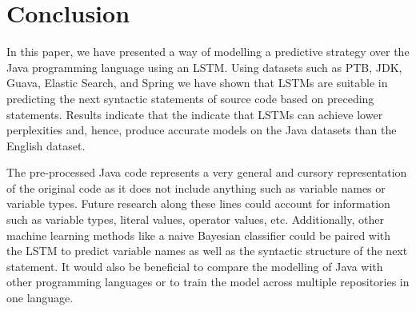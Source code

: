 \documentclass{article}
\begin{document}

\section{Conclusion}

In this paper, we have presented a way of modelling a predictive strategy
over the Java programming language using an LSTM. Using datasets such as PTB,
JDK, Guava, Elastic Search, and Spring we have shown that
LSTMs are suitable in predicting the next syntactic statements of source
code based on preceding statements. Results indicate that the indicate
that LSTMs can achieve lower perplexities and, hence, produce accurate models
on the Java datasets than the English dataset.

The pre-processed Java code represents a very general and cursory
representation of the original code as it does not include anything such
as variable names or variable types. Future research along these lines
could account for information such as variable types, literal values,
operator values, etc. Additionally, other machine learning methods like
a naive Bayesian classifier could be paired with the LSTM to predict
variable names as well as the syntactic structure of the next statement.
It would also be beneficial to compare the modelling of Java with other
programming languages or to train the model across multiple repositories
in one language.








%
\end{document}
